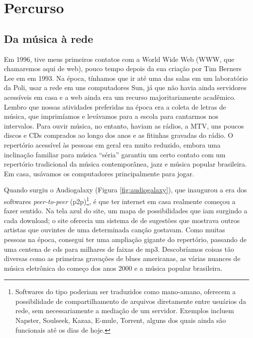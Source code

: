 
\chapter{Percurso}
\label{ch:percurso}


\section{Da música à rede}
    
Em 1996, tive meus primeiros contatos com a World Wide Web (WWW, que chamaremos aqui de web), pouco tempo depois da sua criação por Tim Berners Lee em em 1993. Na época, tínhamos que ir até uma das salas em um laboratório da Poli, usar a rede em uns computadores Sun, já que não havia ainda servidores acessíveis em casa e a web ainda era um recurso majoritariamente acadêmico. Lembro que nossas atividades preferidas na época era a coleta de letras de música, que imprimíamos e levávamos para a escola para cantarmos nos intervalos. Para ouvir música, no entanto, haviam as rádios, a MTV, uns poucos discos e CDs comprados ao longo dos anos e as fitinhas gravadas do rádio. O repertório acessível às pessoas em geral era muito reduzido, embora uma inclinação familiar para música ``séria'' garantiu um certo contato com um repertório tradicional da música contemporânea, jazz e música popular brasileira. Em casa, usávamos os computadores principalmente para jogar.

Quando surgiu o Audiogalaxy (Figura \ref{fig:audiogalaxy}), que inaugurou a era dos softwares \emph{peer-to-peer} (p2p)\footnote{Softwares do tipo poderiam ser traduzidos como mano-amano, oferecem a possibilidade de compartilhamento de arquivos diretamente entre usuários da rede, sem necessariamente a mediação de um servidor. Exemplos incluem Napster, Soulseek, Kazaa, E-mule, Torrent, alguns dos quais ainda são funcionais até os dias de hoje.}, é que ter internet em casa realmente começou a fazer sentido. Na tela azul do site, um mapa de possibilidades que iam surgindo a cada download; o site oferecia um sistema de de sugestões que mostrava outros artistas que ouvintes de uma determinada canção gostavam. Como muitas pessoas na época, consegui ter uma ampliação gigante do repertório, passando de uma centena de cds para milhares de faixas de mp3. Descobríamos coisas tão diversas como as primeiras gravações de blues americanas, as várias nuances de música eletrônica do começo dos anos 2000 e a música popular brasileira. 

